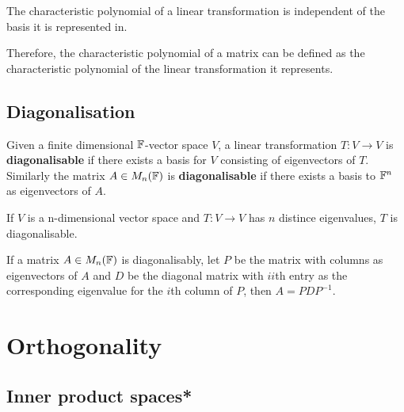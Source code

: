 \begin{theorem}
    The characteristic polynomial of a linear transformation is independent of the basis it is represented in.
\end{theorem}

\begin{remark}
    Therefore, the characteristic polynomial of a matrix can be defined as the characteristic polynomial of the linear transformation it represents.
\end{remark}

\subsection{Diagonalisation}
\begin{definition}[Diagonalisability]
    Given a finite dimensional $\mathbb{F}$-vector space $V$, a linear transformation $T:V\rightarrow V$ is \textbf{diagonalisable} if there exists a basis for $V$ consisting of eigenvectors of $T$. Similarly the matrix $A\in M_n(\mathbb{F})$ is \textbf{diagonalisable} if there exists a basis to $\mathbb{F}^n$ as eigenvectors of $A$.
\end{definition}

\begin{theorem}
    If $V$ is a n-dimensional vector space and $T:V\rightarrow V$ has $n$ distince eigenvalues, $T$ is diagonalisable.
\end{theorem}

\begin{theorem}
    If a matrix $A\in M_n(\mathbb{F})$ is diagonalisably,  let $P$ be the matrix with columns as eigenvectors of $A$ and $D$ be the diagonal matrix with $ii$th entry as the corresponding eigenvalue for the $i$th column of $P$, then $A=PDP^{-1}$.
\end{theorem}

\section{Orthogonality}

\subsection{Inner product spaces*}

